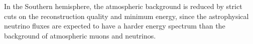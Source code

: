 \documentclass[aps,10pt,prd,twocolumn,floats,letterpaper,showpacs,nofootinbib,bibnotes,notitlepage,superscriptaddress,floatfix]{revtex4-1}
\begin{document}
In the Southern hemisphere, the atmospheric background is reduced by strict cuts on the reconstruction quality and minimum energy, since the astrophysical neutrino fluxes are expected to have a harder energy spectrum than the background of atmospheric muons and neutrinos. 


\end{document}
